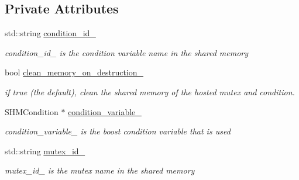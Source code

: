 \subsection*{Private Attributes}
\begin{DoxyCompactItemize}
\item 
std\+::string \hyperlink{classshared__memory_1_1ConditionVariable_a496feeef1a7fec080435b68a79bc163d}{condition\+\_\+id\+\_\+}\hypertarget{classshared__memory_1_1ConditionVariable_a496feeef1a7fec080435b68a79bc163d}{}\label{classshared__memory_1_1ConditionVariable_a496feeef1a7fec080435b68a79bc163d}

\begin{DoxyCompactList}\small\item\em condition\+\_\+id\+\_\+ is the condition variable name in the shared memory \end{DoxyCompactList}\item 
bool \hyperlink{classshared__memory_1_1ConditionVariable_a872a5c9305c0dff22ec085b8c8306a0d}{clean\+\_\+memory\+\_\+on\+\_\+destruction\+\_\+}\hypertarget{classshared__memory_1_1ConditionVariable_a872a5c9305c0dff22ec085b8c8306a0d}{}\label{classshared__memory_1_1ConditionVariable_a872a5c9305c0dff22ec085b8c8306a0d}

\begin{DoxyCompactList}\small\item\em if true (the default), clean the shared memory of the hosted mutex and condition. \end{DoxyCompactList}\item 
S\+H\+M\+Condition $\ast$ \hyperlink{classshared__memory_1_1ConditionVariable_a37c6e1a6ca44d30c2a29990e4460803b}{condition\+\_\+variable\+\_\+}\hypertarget{classshared__memory_1_1ConditionVariable_a37c6e1a6ca44d30c2a29990e4460803b}{}\label{classshared__memory_1_1ConditionVariable_a37c6e1a6ca44d30c2a29990e4460803b}

\begin{DoxyCompactList}\small\item\em condition\+\_\+variable\+\_\+ is the boost condition variable that is used \end{DoxyCompactList}\item 
std\+::string \hyperlink{classshared__memory_1_1ConditionVariable_ab8221877ff8551e608d5d4691d3679ae}{mutex\+\_\+id\+\_\+}\hypertarget{classshared__memory_1_1ConditionVariable_ab8221877ff8551e608d5d4691d3679ae}{}\label{classshared__memory_1_1ConditionVariable_ab8221877ff8551e608d5d4691d3679ae}

\begin{DoxyCompactList}\small\item\em mutex\+\_\+id\+\_\+ is the mutex name in the shared memory \end{DoxyCompactList}\end{DoxyCompactItemize}


